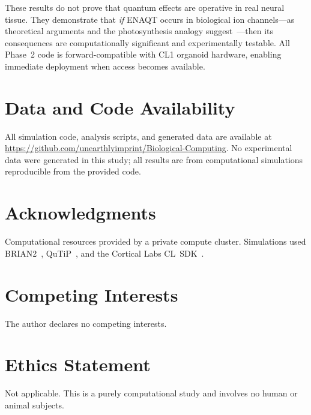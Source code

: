 \documentclass[twocolumn,11pt]{article}
\begin{document}
These results do not prove that quantum effects are operative
in real neural tissue.  They demonstrate that \emph{if} ENAQT
occurs in biological ion channels---as theoretical arguments
and the photosynthesis analogy
suggest~\cite{Mohseni2008,Plenio2008,Rebentrost2009}---then
its consequences are computationally significant and
experimentally testable.  All Phase~2 code is
forward-compatible with CL1 organoid hardware, enabling
immediate deployment when access becomes available.

\section*{Data and Code Availability}
All simulation code, analysis scripts, and generated data are
available at
\url{https://github.com/unearthlyimprint/Biological-Computing}.
No experimental data were generated in this study; all results
are from computational simulations reproducible from the
provided code.

\section*{Acknowledgments}
Computational resources provided by a private compute cluster.
Simulations used BRIAN2~\cite{Stimberg2019},
QuTiP~\cite{Johansson2012,Johansson2013}, and the
Cortical Labs CL~SDK~\cite{CLSDK2024}.

\section*{Competing Interests}
The author declares no competing interests.

\section*{Ethics Statement}
Not applicable.  This is a purely computational study and
involves no human or animal subjects.



\end{document}
